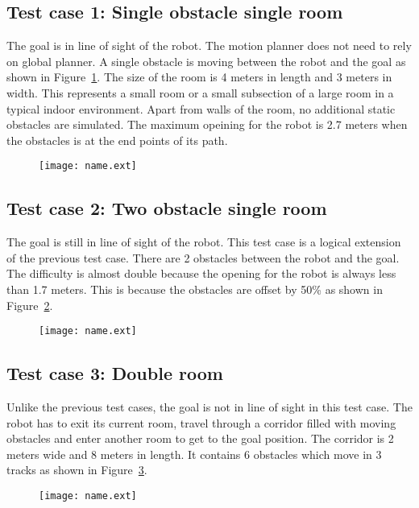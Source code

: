 \newpage{}
\subsection{Test case 1: Single obstacle single room}%
\label{sub:test_case_1_single_obstacle_single_room}
    The goal is in line of sight of the robot. The motion planner does not need to rely on 
    global planner. A single obstacle is moving between the robot and the goal as shown in 
    Figure~\ref{fig:single_obs_single_room}. The size of the room is 4 meters in length and 3 
    meters in width. This represents a small room or a small subsection of a large room in a 
    typical indoor environment. Apart from walls of the room, no additional static obstacles are
    simulated. The maximum opeining for the robot is 2.7 meters when the obstacles is at the 
    end points of its path.
\begin{figure}[htpb]
    \centering
    \texttt{[image: name.ext]}
    \caption{\label{fig:single_obs_single_room}}
\end{figure}

\newpage{}
\subsection{Test case 2: Two obstacle single room}%
\label{sub:test_case_2_two_obstacle_single_room}
    The goal is still in line of sight of the robot. This test case is a logical extension of
    the previous test case. There are 2 obstacles between the robot and the goal. The difficulty
    is almost double because the opening for the robot is always less than 1.7 meters. This is 
    because the obstacles are offset by 50\% as shown in Figure~\ref{fig:two_obstacle_single_room}.
\begin{figure}[htpb]
    \centering
    \texttt{[image: name.ext]}
    \caption{\label{fig:two_obstacle_single_room}}
\end{figure}

\newpage{}
\subsection{Test case 3: Double room}%
\label{sub:test_case_3_double_room}
    Unlike the previous test cases, the goal is not in line of sight in this test case. The 
    robot has to exit its current room, travel through a corridor filled with moving obstacles 
    and enter another room to get to the goal position. The corridor is 2 meters wide and 8 meters
    in length. It contains 6 obstacles which move in 3 tracks as shown in Figure~\ref{fig:double_room}.
\begin{figure}[htpb]
    \centering
    \texttt{[image: name.ext]}
    \caption{\label{fig:double_room}}
\end{figure}





